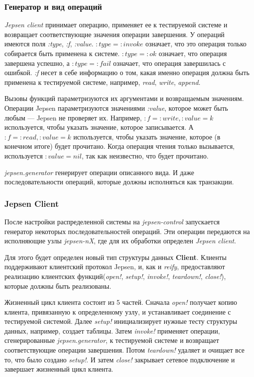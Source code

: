 \documentclass[12pt,  openany]{book}
\begin{document}
\subsubsection{Генератор и вид операций}
\textit{Jepsen client} принимает операцию, применяет ее к тестируемой системе и возвращает соответствующие значения операции завершения.  У операций имеются поля \textit{:type}, \textit{:f}, \textit{:value}.  $:type=:invoke$ означает, что это операция только собирается быть применена к системе.  $:type=:ok$ означает, что операция завершена успешно, а $:type=:fail$ означает, что операция завершилась с ошибкой.  \textit{:f} несет в себе информацию о том, какая именно операция должна быть применена к тестируемой системе, например, \textit{read}, \textit{write}, \textit{append}.
\par Вызовы функций параметризуются их аргументами и возвращаемым значениям. Операции Jepsen параметризуются значениями \textit{:value}, которое может быть любым --- Jepsen не проверяет их. Например,  $:f=:write, :value=k$ используется, чтобы указать значение, которое записывается. А $:f=:read, :value=k$ используется, чтобы указать значение, которое (в конечном итоге) будет прочитано. Когда операция чтения только вызывается,  используется $:value = nil$, так как неизвестно, что будет прочитано.
\par \textit{jepsen.generator} генерирует операции описанного вида. И даже последовательности операций, которые должны исполняться как транзакции. 

\subsubsection{Jepsen Client}
После настройки распределенной системы на \textit{jepsen-control}  запускается генератор некоторых последовательностей операций.  Эти операции передаются на исполняющие узлы \textit{jepsen-nX}, где для их обработки определен \textit{Jepsen client}. 
\par Для этого будет определен новый тип структуры данных \textbf{Client}.  Клиенты поддерживают клиентский протокол Jepsen, и, как и \textit{reify}, предоставляют реализацию клиентских функций(\textit{open!}, \textit{setup!}, \textit{invoke!}, \textit{teardown!}, \textit{close!}), которые должны быть реализованы.  
\par Жизненный цикл клиента состоит из 5 частей. Сначала \textit{open!} получает копию клиента, привязанную к определенному узлу, и устанавливает соединение с тестируемой системой. Далее \textit{setup!} инициализирует нужные тесту структуры данных, например, создает таблицы. Затем \textit{invoke!} применяет операции, сгенерированные \textit{jepsen.generator}, к тестируемой системе и возвращает соответствующие операции завершения. Потом \textit{teardown!} удаляет и очищает все то, что было создано \textit{setup!}. И затем \textit{close!} закрывает сетевое подключение и завершает жизненный цикл клиента.
\end{document}
